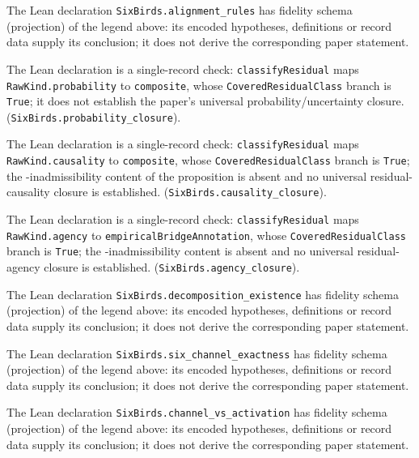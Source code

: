 \begin{description}[style=unboxed,leftmargin=0pt,itemsep=3pt]
  \item[Proposition~\ref{prop:alignment-rules}.] The Lean declaration \texttt{SixBirds.alignment\_rules} has fidelity schema (projection) of the legend above: its encoded hypotheses, definitions or record data supply its conclusion; it does not derive the corresponding paper statement.
  \item[Proposition~\ref{prop:probability-closure}.] The Lean declaration is a single-record check: \texttt{classifyResidual} maps \texttt{RawKind.probability} to \texttt{composite}, whose \texttt{CoveredResidualClass} branch is \texttt{True}; it does not establish the paper's universal probability/uncertainty closure. (\texttt{SixBirds.probability\_closure}).
  \item[Proposition~\ref{prop:causality-closure}.] The Lean declaration is a single-record check: \texttt{classifyResidual} maps \texttt{RawKind.causality} to \texttt{composite}, whose \texttt{CoveredResidualClass} branch is \texttt{True}; the \Pfive{}-inadmissibility content of the proposition is absent and no universal residual-causality closure is established. (\texttt{SixBirds.causality\_closure}).
  \item[Proposition~\ref{prop:agency-closure}.] The Lean declaration is a single-record check: \texttt{classifyResidual} maps \texttt{RawKind.agency} to \texttt{empiricalBridgeAnnotation}, whose \texttt{CoveredResidualClass} branch is \texttt{True}; the \Pone{}-inadmissibility content is absent and no universal residual-agency closure is established. (\texttt{SixBirds.agency\_closure}).
  \item[Theorem~\ref{thm:decomposition-existence}.] The Lean declaration \texttt{SixBirds.decomposition\_existence} has fidelity schema (projection) of the legend above: its encoded hypotheses, definitions or record data supply its conclusion; it does not derive the corresponding paper statement.
  \item[Theorem~\ref{thm:six-channel-exactness}.] The Lean declaration \texttt{SixBirds.six\_channel\_exactness} has fidelity schema (projection) of the legend above: its encoded hypotheses, definitions or record data supply its conclusion; it does not derive the corresponding paper statement.
  \item[Proposition~\ref{prop:channel-vs-activation}.] The Lean declaration \texttt{SixBirds.channel\_vs\_activation} has fidelity schema (projection) of the legend above: its encoded hypotheses, definitions or record data supply its conclusion; it does not derive the corresponding paper statement.

\end{description}
